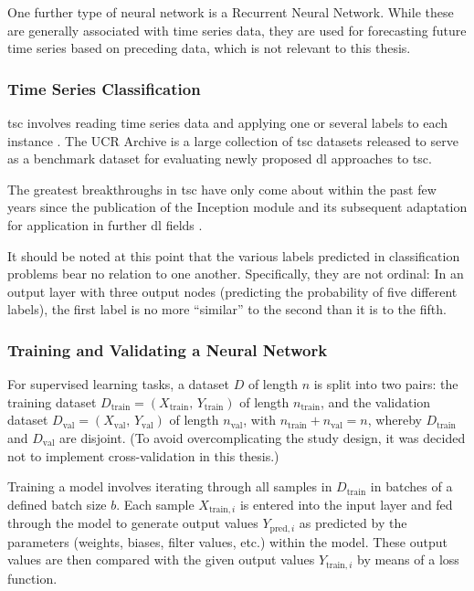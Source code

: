 One further type of neural network is a Recurrent Neural Network. While these are generally associated with time series data, they are used for forecasting future time series based on preceding data, which is not relevant to this thesis.

\subsubsection{Time Series Classification}\label{sec:tsc}
\ac{tsc} involves reading time series data and applying one or several labels to each instance \cite{fawaz_inceptiontime_2019}. The UCR Archive \cite{dau_ucr_2019} is a large collection of \ac{tsc} datasets released to serve as a benchmark dataset for evaluating newly proposed \ac{dl} approaches to \ac{tsc}.

The greatest breakthroughs in \ac{tsc} have only come about within the past few years since the publication of the Inception module \cite[]{szegedy_going_2014} and its subsequent adaptation for application in further \ac{dl} fields \cite{ismail_fawaz_deep_2019, fawaz_inceptiontime_2019}.

It should be noted at this point that the various labels predicted in classification problems bear no relation to one another. Specifically, they are not ordinal: In an output layer with three output nodes (predicting the probability of five different labels), the first label is no more ``similar'' to the second than it is to the fifth.

\subsubsection{Training and Validating a Neural Network}
For supervised learning tasks, a dataset \(D\) of length \(n\) is split into two pairs: the training dataset \(D_{\text{train}} = \left(X_{\text{train}},\,Y_{\text{train}}\right)\) of length \(n_{\text{train}}\), and the validation dataset \(D_{\text{val}} = \left(X_{\text{val}},\,Y_{\text{val}}\right)\) of length \(n_{\text{val}}\), with \(n_{\text{train}} + n_{\text{val}} = n\), whereby \(D_{\text{train}}\) and \(D_{\text{val}}\) are disjoint. (To avoid overcomplicating the study design, it was decided not to implement cross-validation in this thesis.)

Training a model involves iterating through all samples in \(D_{\text{train}}\) in batches of a defined batch size \(b\). Each sample \(X_{\text{train}, i}\) is entered into the input layer and fed through the model to generate output values \(Y_{\text{pred}, i}\) as predicted by the parameters (weights, biases, filter values, etc.) within the model. These output values are then compared with the given output values \(Y_{\text{train}, i}\) by means of a loss function.

